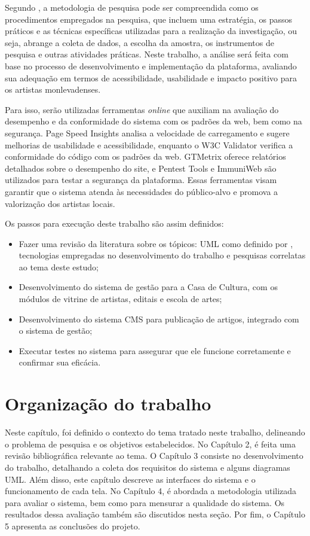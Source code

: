 Segundo , a metodologia de pesquisa pode ser compreendida como os procedimentos empregados na pesquisa, que incluem uma estratégia, os passos práticos e as técnicas específicas utilizadas para a realização da investigação, ou seja, abrange a coleta de dados, a escolha da amostra, os instrumentos de pesquisa e outras atividades práticas. Neste trabalho, a análise será feita com base no processo de desenvolvimento e implementação da plataforma, avaliando sua adequação em termos de acessibilidade, usabilidade e impacto positivo para os artistas monlevadenses. 

Para isso, serão utilizadas ferramentas \textit{online} que auxiliam na avaliação do desempenho e da conformidade do sistema com os padrões da web, bem como na segurança. Page Speed Insights analisa a velocidade de carregamento e sugere melhorias de usabilidade e acessibilidade, enquanto o W3C Validator verifica a conformidade do código com os padrões da web. GTMetrix oferece relatórios detalhados sobre o desempenho do site, e Pentest Tools e ImmuniWeb são utilizados para testar a segurança da plataforma. Essas ferramentas visam garantir que o sistema atenda às necessidades do público-alvo e promova a valorização dos artistas locais.

Os passos para execução deste trabalho são assim definidos:

\begin{itemize}
	\item Fazer uma revisão da literatura sobre os tópicos: \ac{UML} como definido por , tecnologias empregadas no desenvolvimento do trabalho e pesquisas correlatas ao tema deste estudo;
	\item Desenvolvimento do sistema de gestão para a Casa de Cultura, com os módulos de vitrine de artistas, editais e escola de artes;
	\item Desenvolvimento do sistema \ac{CMS} para publicação de artigos, integrado com o sistema de gestão;
	\item Executar testes no sistema para assegurar que ele funcione corretamente e confirmar sua eficácia.
\end{itemize}

\section{Organização do trabalho}

Neste capítulo, foi definido o contexto do tema tratado neste trabalho, delineando o problema de pesquisa e os objetivos estabelecidos. No Capítulo 2, é feita uma revisão bibliográfica relevante ao tema. O Capítulo 3 consiste no desenvolvimento do trabalho, detalhando a coleta dos requisitos do sistema e alguns diagramas \ac{UML}. Além disso, este capítulo descreve as interfaces do sistema e o funcionamento de cada tela. No Capítulo 4, é abordada a metodologia utilizada para avaliar o sistema, bem como para mensurar a qualidade do sistema. Os resultados dessa avaliação também são discutidos nesta seção. Por fim, o Capítulo 5 apresenta as conclusões do projeto.
